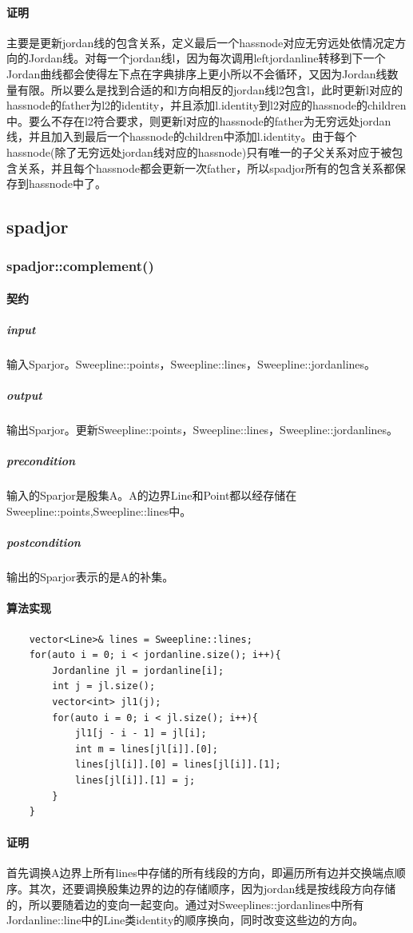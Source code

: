 \documentclass[a4paper]{book}
\numberwithin{equation}{chapter}
\theoremstyle{definition}
\begin{document}
\paragraph{证明}
主要是更新jordan线的包含关系，定义最后一个hassnode对应无穷远处依情况定方向的Jordan线。对每一个jordan线l，因为每次调用leftjordanline转移到下一个Jordan曲线都会使得左下点在字典排序上更小所以不会循环，又因为Jordan线数量有限。所以要么是找到合适的和l方向相反的jordan线l2包含l，此时更新l对应的hassnode的father为l2的identity，并且添加l.identity到l2对应的hassnode的children中。要么不存在l2符合要求，则更新l对应的hassnode的father为无穷远处jordan线，并且加入到最后一个hassnode的children中添加l.identity。由于每个hassnode(除了无穷远处jordan线对应的hassnode)只有唯一的子父关系对应于被包含关系，并且每个hassnode都会更新一次father，所以spadjor所有的包含关系都保存到hassnode中了。

\subsection{spadjor}
\subsubsection{spadjor::complement()}
\paragraph{契约}
\subparagraph{input}
输入Sparjor。Sweepline::points，Sweepline::lines，Sweepline::jordanlines。
\subparagraph{output}
输出Sparjor。更新Sweepline::points，Sweepline::lines，Sweepline::jordanlines。
\subparagraph{precondition}
输入的Sparjor是殷集A。A的边界Line和Point都以经存储在Sweepline::points,Sweepline::lines中。
\subparagraph{postcondition}
输出的Sparjor表示的是A的补集。
\paragraph{算法实现}
\begin{lstlisting}
	vector<Line>& lines = Sweepline::lines;
	for(auto i = 0; i < jordanline.size(); i++){
		Jordanline jl = jordanline[i];
		int j = jl.size();
		vector<int> jl1(j);
		for(auto i = 0; i < jl.size(); i++){
			jl1[j - i - 1] = jl[i];
			int m = lines[jl[i]].[0];
			lines[jl[i]].[0] = lines[jl[i]].[1];
			lines[jl[i]].[1] = j;
		}
	}
\end{lstlisting}
\paragraph{证明}
首先调换A边界上所有lines中存储的所有线段的方向，即遍历所有边并交换端点顺序。其次，还要调换殷集边界的边的存储顺序，因为jordan线是按线段方向存储的，所以要随着边的变向一起变向。通过对Sweeplines::jordanlines中所有Jordanline::line中的Line类identity的顺序换向，同时改变这些边的方向。
\end{document}
